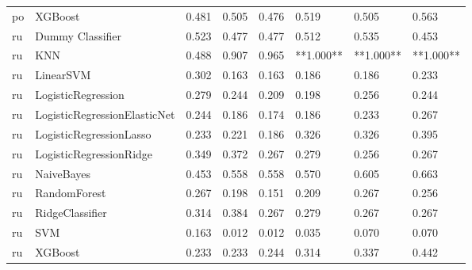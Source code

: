 \begin{tabular}{llllllll}
      po &                      XGBoost & 0.481 &                     0.505 &                 0.476 &                  0.519 &                                   0.505 &     0.563 \\
      ru &             Dummy Classifier & 0.523 &                     0.477 &                 0.477 &                  0.512 &                                   0.535 &     0.453 \\
      ru &                          KNN & 0.488 &                     0.907 &                 0.965 &              **1.000** &                               **1.000** & **1.000** \\
      ru &                    LinearSVM & 0.302 &                     0.163 &                 0.163 &                  0.186 &                                   0.186 &     0.233 \\
      ru &           LogisticRegression & 0.279 &                     0.244 &                 0.209 &                  0.198 &                                   0.256 &     0.244 \\
      ru & LogisticRegressionElasticNet & 0.244 &                     0.186 &                 0.174 &                  0.186 &                                   0.233 &     0.267 \\
      ru &      LogisticRegressionLasso & 0.233 &                     0.221 &                 0.186 &                  0.326 &                                   0.326 &     0.395 \\
      ru &      LogisticRegressionRidge & 0.349 &                     0.372 &                 0.267 &                  0.279 &                                   0.256 &     0.267 \\
      ru &                   NaiveBayes & 0.453 &                     0.558 &                 0.558 &                  0.570 &                                   0.605 &     0.663 \\
      ru &                 RandomForest & 0.267 &                     0.198 &                 0.151 &                  0.209 &                                   0.267 &     0.256 \\
      ru &              RidgeClassifier & 0.314 &                     0.384 &                 0.267 &                  0.279 &                                   0.267 &     0.267 \\
      ru &                          SVM & 0.163 &                     0.012 &                 0.012 &                  0.035 &                                   0.070 &     0.070 \\
      ru &                      XGBoost & 0.233 &                     0.233 &                 0.244 &                  0.314 &                                   0.337 &     0.442 \\
\bottomrule
\end{tabular}
